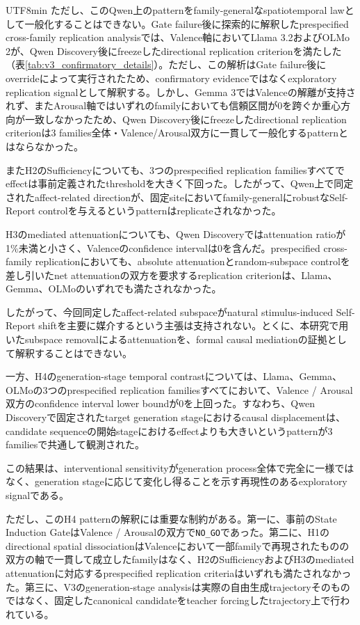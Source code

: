 \documentclass{article} %
\begin{document}
\begin{CJK*}{UTF8}{min}
ただし、このQwen上のpatternをfamily-generalなspatiotemporal lawとして一般化することはできない。Gate failure後に探索的に解釈したprespecified cross-family replication analysisでは、Valence軸においてLlama 3.2およびOLMo 2が、Qwen Discovery後にfreezeしたdirectional replication criterionを満たした（表\ref{tab:v3_confirmatory_details}）。ただし、この解析はGate failure後にoverrideによって実行されたため、confirmatory evidenceではなくexploratory replication signalとして解釈する。しかし、Gemma 3ではValenceの解離が支持されず、またArousal軸ではいずれのfamilyにおいても信頼区間が0を跨ぐか重心方向が一致しなかったため、Qwen Discovery後にfreezeしたdirectional replication criterionは3 families全体・Valence/Arousal双方に一貫して一般化するpatternとはならなかった。

またH2のSufficiencyについても、3つのprespecified replication familiesすべてでeffectは事前定義されたthresholdを大きく下回った。したがって、Qwen上で同定されたaffect-related directionが、固定siteにおいてfamily-generalにrobustなSelf-Report controlを与えるというpatternはreplicateされなかった。

H3のmediated attenuationについても、Qwen Discoveryではattenuation ratioが1\%未満と小さく、Valenceのconfidence intervalは0を含んだ。prespecified cross-family replicationにおいても、absolute attenuationとrandom-subspace controlを差し引いたnet attenuationの双方を要求するreplication criterionは、Llama、Gemma、OLMoのいずれでも満たされなかった。

したがって、今回同定したaffect-related subspaceがnatural stimulus-induced Self-Report shiftを主要に媒介するという主張は支持されない。とくに、本研究で用いたsubspace removalによるattenuationを、formal causal mediationの証拠として解釈することはできない。

一方、H4のgeneration-stage temporal contrastについては、Llama、Gemma、OLMoの3つのprespecified replication familiesすべてにおいて、Valence / Arousal双方のconfidence interval lower boundが0を上回った。すなわち、Qwen Discoveryで固定されたtarget generation stageにおけるcausal displacementは、candidate sequenceの開始stageにおけるeffectよりも大きいというpatternが3 familiesで共通して観測された。

この結果は、interventional sensitivityがgeneration process全体で完全に一様ではなく、generation stageに応じて変化し得ることを示す再現性のあるexploratory signalである。

ただし、このH4 patternの解釈には重要な制約がある。第一に、事前のState Induction GateはValence / Arousalの双方で\texttt{NO\_GO}であった。第二に、H1のdirectional spatial dissociationはValenceにおいて一部familyで再現されたものの双方の軸で一貫して成立したfamilyはなく、H2のSufficiencyおよびH3のmediated attenuationに対応するprespecified replication criteriaはいずれも満たされなかった。第三に、V3のgeneration-stage analysisは実際の自由生成trajectoryそのものではなく、固定したcanonical candidateをteacher forcingしたtrajectory上で行われている。


\end{CJK*}
\end{document}
